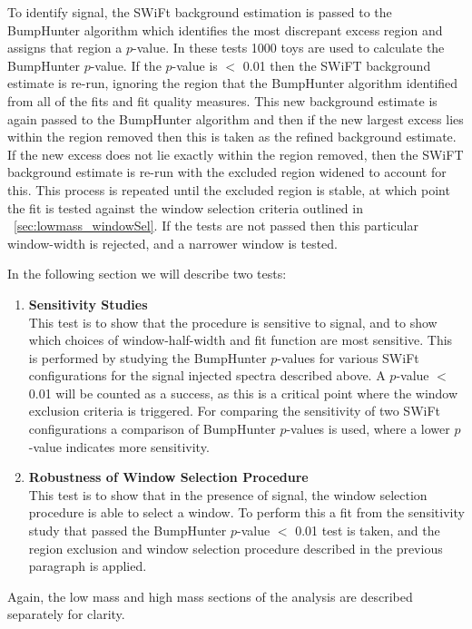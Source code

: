 To identify signal,
the SWiFt background estimation is passed to the {\sc BumpHunter} algorithm which identifies the most discrepant excess region
and assigns that region a $p$-value.
In these tests 1000 toys are used to calculate the {\sc BumpHunter} $p$-value.
If the $p$-value is $<$ 0.01 then the SWiFT background estimate is re-run,
ignoring the region that the {\sc BumpHunter} algorithm identified from all of the fits and fit quality measures.
This new background estimate is again passed to the {\sc BumpHunter} algorithm and
then if the new largest excess lies within the region removed then this is taken as the refined background estimate.
If the new excess does not lie exactly within the region removed,
then the SWiFT background estimate is re-run
with the excluded region widened to account for this.
This process is repeated until the excluded region is stable,
at which point the fit is tested against the window selection
criteria outlined in ~\ref{sec:lowmass_windowSel}.
If the tests are not passed then this particular window-width is rejected, and a narrower window is tested.

\noindent
In the following section we will describe two tests:
\begin{enumerate}
  \item\textbf{Sensitivity Studies}\\
  This test is to show that the procedure is sensitive to signal,
  and to show which choices of window-half-width and fit function are most sensitive.
  This is performed by studying the {\sc BumpHunter} $p$-values for various SWiFt configurations for the signal injected spectra described above.
  A $p$-value $<$ 0.01 will be counted as a success, as this is a critical point  where the window exclusion criteria is triggered.
  For comparing the sensitivity of two SWiFt configurations a comparison of {\sc BumpHunter} $p$-values is used, where a lower $p$-value indicates more sensitivity.
  
  \item\textbf{Robustness of Window Selection Procedure}\\
  This test is to show that in the presence of signal, the window selection procedure is able to select a window.
  To perform this a fit from the sensitivity study that passed the {\sc BumpHunter} $p$-value $<$ 0.01 test is taken,
  and the region exclusion and  window selection procedure described in the previous paragraph is applied.
\end{enumerate}

\noindent
Again, the low mass and high mass sections of the analysis are described separately for clarity.

